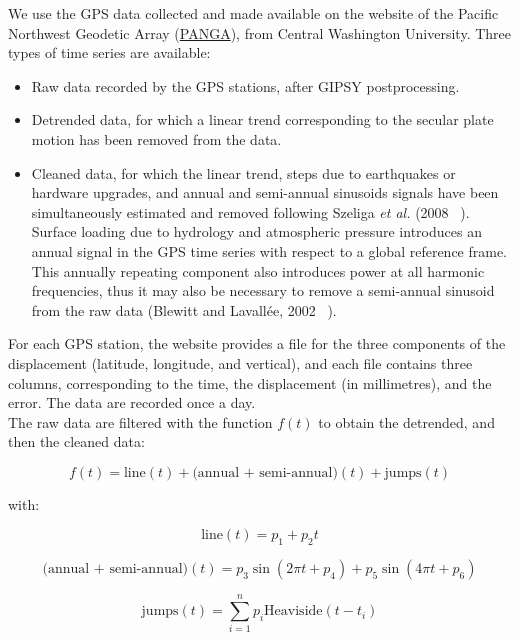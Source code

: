 \documentclass[main.tex]{subfiles}
\begin{document}
We use the GPS data collected and made available on the website of the Pacific Northwest Geodetic Array (\href{http://www.geodesy.cwu.edu/}{PANGA}), from Central Washington University. Three types of time series are available:

\begin{itemize}
\item Raw data recorded by the GPS stations, after GIPSY postprocessing.
\item Detrended data, for which a linear trend corresponding to the secular plate motion has been removed from the data.
\item Cleaned data, for which the linear trend, steps due to earthquakes or hardware upgrades, and annual and semi-annual sinusoids signals have been simultaneously estimated and removed following Szeliga \textit{et al.} (2008 ~\cite{SZE_2008}). Surface loading due to hydrology and atmospheric pressure introduces an annual signal in the GPS time series with respect to a global reference frame. This annually repeating component also introduces power at all harmonic frequencies, thus it may also be necessary to remove a semi-annual sinusoid from the raw data (Blewitt and Lavall\'ee, 2002 ~\cite{BLE_2002}).
\end{itemize}

For each GPS station, the website provides a file for the three components of the displacement (latitude, longitude, and vertical), and each file contains three columns, corresponding to the time, the displacement (in millimetres), and the error. The data are recorded once a day. \\

The raw data are filtered with the function $f (t)$ to obtain the detrended, and then the cleaned data:

\begin{equation}
f (t) = \textrm{line} (t) + \textrm{(annual + semi-annual)} (t) + \textrm{jumps} (t)
\end{equation}

with:

\begin{equation}
\textrm{line} (t) = p_1 + p_2 t
\end{equation}

\begin{equation}
\textrm{(annual + semi-annual)} (t) = p_3 \sin (2 \pi t + p_4) + p_5 \sin (4 \pi t + p_6)
\end{equation}

\begin{equation}
\textrm{jumps} (t) = \sum_{i = 1}^{n} p_i \textrm{Heaviside} (t - t_i)
\end{equation}
\end{document}
